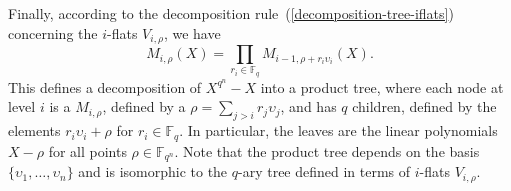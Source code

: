 \documentclass{article}
\newcommand{\ff}[1]{\mathbb{F}_{#1}}
\newcommand{\qq}{q}
\newcommand{\nn}{n}
\newcommand{\qn}{{\qq^\nn}}
\newcommand{\basef}{\ff{\qq}}
\newcommand{\extf}{\ff{\qn}}
\begin{document}
Finally, according to the decomposition rule~(\ref{decomposition-tree-iflats}) concerning the $i$-flats $V_{i,\rho}$, we have
\begin{equation}
\label{node_product}
  M_{i,\rho}(X) = \prod_{r_i\in\basef} M_{i-1,\rho+r_i\upsilon_i}(X).
\end{equation}
This defines a decomposition of $X^{\qn}-X$ into a product tree, where
each node at level $i$ is a $M_{i,\rho}$, defined by a
$\rho=\sum_{j>i}r_j\upsilon_j$, and has $\qq$ children, defined by
the elements $r_i\upsilon_{i}+\rho$ for $r_i \in\basef$. In particular,
the leaves are the linear polynomials $X-\rho$ for all points
$\rho\in\extf$.
%
Note that the product tree depends on the basis $\{\upsilon_1,\ldots,\upsilon_\nn\}$ and is isomorphic to the $q$-ary tree defined in terms of $i$-flats $V_{i,\rho}$.


\end{document}
